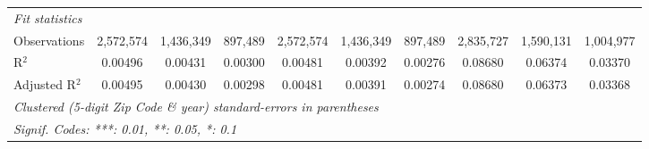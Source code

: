 \begin{tabular}{lccccccccc}
   \midrule
   \emph{Fit statistics}\\
   Observations                                               & 2,572,574      & 1,436,349      & 897,489        & 2,572,574      & 1,436,349      & 897,489        & 2,835,727      & 1,590,131      & 1,004,977\\  
   R$^2$                                                      & 0.00496        & 0.00431        & 0.00300        & 0.00481        & 0.00392        & 0.00276        & 0.08680        & 0.06374        & 0.03370\\  
   Adjusted R$^2$                                             & 0.00495        & 0.00430        & 0.00298        & 0.00481        & 0.00391        & 0.00274        & 0.08680        & 0.06373        & 0.03368\\  
   \midrule \midrule
   \multicolumn{10}{l}{\emph{Clustered (5-digit Zip Code \& year) standard-errors in parentheses}}\\
   \multicolumn{10}{l}{\emph{Signif. Codes: ***: 0.01, **: 0.05, *: 0.1}}\\
\end{tabular}
\par\endgroup
